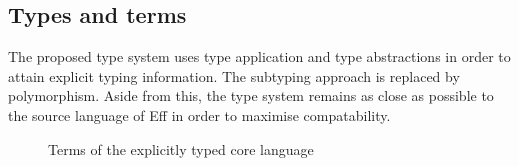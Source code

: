 \subsection{Types and terms}
The proposed type system uses type application and type abstractions in order to attain explicit typing information. The subtyping approach is replaced by polymorphism. Aside from this, the type system remains as close as possible to the source language of Eff in order to maximise compatability.

\begin{figure}[h]
\begin{center}
\end{center}
\caption{Terms of the explicitly typed core language}\label{fig:terms:explicit}
\end{figure}

